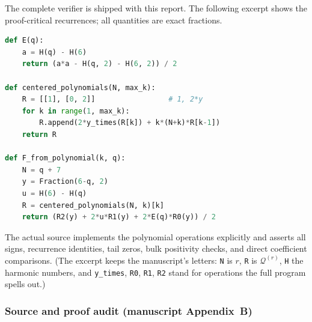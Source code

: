 \documentclass[11pt,a4paper]{article}
\numberwithin{equation}{section}
\theoremstyle{definition}
\theoremstyle{remark}
\theoremstyle{plain}
\begin{document}
The complete verifier is shipped with this report.  The following excerpt
shows the proof-critical recurrences; all quantities are exact fractions.
\begin{lstlisting}[language=Python]
def E(q):
    a = H(q) - H(6)
    return (a*a - H(q, 2) - H(6, 2)) / 2

def centered_polynomials(N, max_k):
    R = [[1], [0, 2]]                 # 1, 2*y
    for k in range(1, max_k):
        R.append(2*y_times(R[k]) + k*(N+k)*R[k-1])
    return R

def F_from_polynomial(k, q):
    N = q + 7
    y = Fraction(6-q, 2)
    u = H(6) - H(q)
    R = centered_polynomials(N, k)[k]
    return (R2(y) + 2*u*R1(y) + 2*E(q)*R0(y)) / 2
\end{lstlisting}
The actual source implements the polynomial operations explicitly and asserts
all signs, recurrence identities, tail zeros, bulk positivity checks, and
direct coefficient comparisons.  (The excerpt keeps the manuscript's letters:
\texttt{N} is $r$, \texttt{R} is $\mathcal Q^{(r)}$, \texttt{H} the harmonic
numbers, and \texttt{y\_times}, \texttt{R0}, \texttt{R1}, \texttt{R2} stand
for operations the full program spells out.)

\subsubsection{Source and proof audit (manuscript Appendix~B)}
\end{document}
